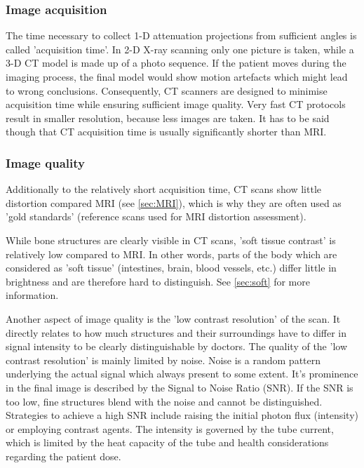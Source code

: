 \subsubsection{Image acquisition}
The time necessary to collect 1-D attenuation projections from sufficient angles is called 'acquisition time'.
In 2-D X-ray scanning only one picture is taken, while a 3-D CT model is made up of a photo sequence.
If the patient moves during the imaging process, the final model would show motion artefacts which might lead to wrong conclusions.
Consequently, CT scanners are designed to minimise acquisition time while ensuring sufficient image quality.
Very fast CT protocols result in smaller resolution, because less images are taken.
It has to be said though that CT acquisition time is usually significantly shorter than MRI. \cite{Podgorsak, Maidment2014}

\subsubsection{Image quality} %
Additionally to the relatively short acquisition time, CT scans show little distortion compared MRI (see \ref{sec:MRI}), which is why they are often used as 'gold standards' (reference scans used for MRI distortion assessment).

While bone structures are clearly visible in CT scans, 'soft tissue contrast' is relatively low compared to MRI.
In other words, parts of the body which are considered as 'soft tissue' (intestines, brain, blood vessels, etc.) differ little in brightness and are therefore hard to distinguish.
See \ref{sec:soft} for more information.

Another aspect of image quality is the 'low contrast resolution' of the scan.
It directly relates to how much structures and their surroundings have to differ in signal intensity to be clearly distinguishable by doctors.
The quality of the 'low contrast resolution' is mainly limited by noise.
Noise is a random pattern underlying the actual signal which always present to some extent.
It's prominence in the final image is described by the Signal to Noise Ratio (SNR).
If the SNR is too low, fine structures blend with the noise and cannot be distinguished. 
Strategies to achieve a high SNR include raising the initial photon flux (intensity) or employing contrast agents.
The intensity is governed by the tube current, which is limited by the heat capacity of the tube and health considerations regarding the patient dose.

